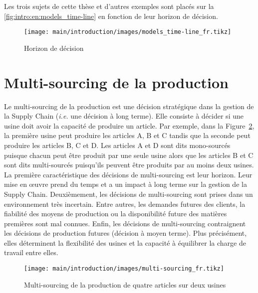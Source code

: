 Les trois sujets de cette thèse et d'autres exemples sont placés sur la \cref{fig:intro:en:models_time-line} en fonction de leur horizon de décision.
\begin{figure}[!ht]
  \centering
  \texttt{[image: main/introduction/images/models\_time-line\_fr.tikz]}
  \caption{Horizon de décision}
  \label{fig:intro:fr:models_time-line}
\end{figure}


\section{Multi-sourcing de la production}
\label{sec:intro:fr:multi-sourcing}


Le multi-sourcing de la production est une décision stratégique dans la gestion de la Supply Chain (\emph{i.e.} une décision à long terme).
Elle consiste à décider si une usine doit avoir la capacité de produire un article.
Par exemple, dans la Figure~\ref{fig:intro:fr:multi-sourcing}, la première usine peut produire les articles A, B et C tandis que la seconde peut produire les articles B, C et D.
Les articles A et D sont dits mono-sourcés puisque chacun peut être produit par une seule usine alors que les articles B et C sont dits multi-sourcés puisqu'ils peuvent être produits par au moins deux usines.
La première caractéristique des décisions de multi-sourcing est leur horizon.
Leur mise en \oe{}uvre prend du temps et a un impact à long terme sur la gestion de la Supply Chain.
Deuxièmement, les décisions de multi-sourcing sont prises dans un environnement très incertain.
Entre autres, les demandes futures des clients, la fiabilité des moyens de production ou la disponibilité future des matières premières sont mal connues.
Enfin, les décisions de multi-sourcing contraignent les décisions de production futures (décision à moyen terme).
Plus précisément, elles déterminent la flexibilité des usines et la capacité à équilibrer la charge de travail entre elles.


\begin{figure}[!ht]
  \centering
  \texttt{[image: main/introduction/images/multi-sourcing\_fr.tikz]}
  \caption{Multi-sourcing de la production de quatre articles sur deux usines}
  \label{fig:intro:fr:multi-sourcing}
\end{figure}


